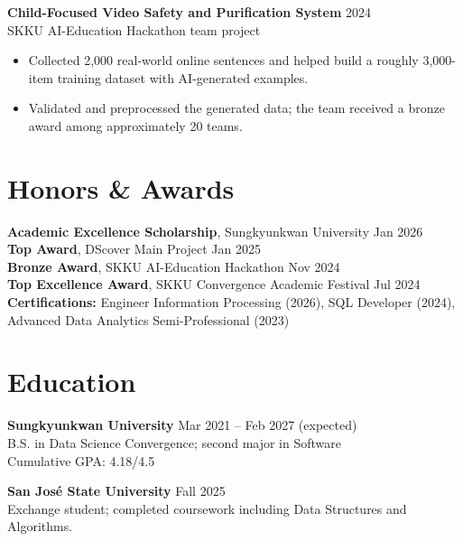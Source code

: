 \documentclass[10pt,a4paper]{article}
\begin{document}
\textbf{Child-Focused Video Safety and Purification System} \hfill 2024\\
SKKU AI-Education Hackathon team project
\begin{itemize}
    \item Collected 2,000 real-world online sentences and helped build a roughly 3,000-item training dataset with AI-generated examples.
    \item Validated and preprocessed the generated data; the team received a bronze award among approximately 20 teams.
\end{itemize}

\section*{Honors \& Awards}
\textbf{Academic Excellence Scholarship}, Sungkyunkwan University \hfill Jan 2026\\
\textbf{Top Award}, DScover Main Project \hfill Jan 2025\\
\textbf{Bronze Award}, SKKU AI-Education Hackathon \hfill Nov 2024\\
\textbf{Top Excellence Award}, SKKU Convergence Academic Festival \hfill Jul 2024\\
\textbf{Certifications:} Engineer Information Processing (2026), SQL Developer (2024), Advanced Data Analytics Semi-Professional (2023)

\section*{Education}
\textbf{Sungkyunkwan University} \hfill Mar 2021 -- Feb 2027 (expected)\\
B.S. in Data Science Convergence; second major in Software\\
Cumulative GPA: 4.18/4.5

\textbf{San Jos\'e State University} \hfill Fall 2025\\
Exchange student; completed coursework including Data Structures and Algorithms.
\end{document}
